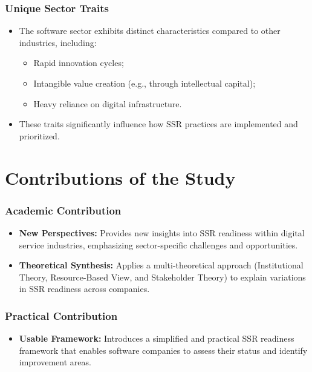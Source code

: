 \subsubsection{Unique Sector Traits}

\begin{itemize}
    \item The software sector exhibits distinct characteristics compared to other industries, including:
    \begin{itemize}
        \item Rapid innovation cycles;
        \item Intangible value creation (e.g., through intellectual capital);
        \item Heavy reliance on digital infrastructure.
    \end{itemize}
    \item These traits significantly influence how SSR practices are implemented and prioritized.
\end{itemize}

\section{Contributions of the Study}

\subsubsection{Academic Contribution}

\begin{itemize}
    \item \textbf{New Perspectives:}  
    Provides new insights into SSR readiness within digital service industries, 
    emphasizing sector-specific challenges and opportunities.
    
    \item \textbf{Theoretical Synthesis:}  
    Applies a multi-theoretical approach (Institutional Theory, Resource-Based View, and Stakeholder Theory) 
    to explain variations in SSR readiness across companies.
\end{itemize}

\subsubsection{Practical Contribution}

\begin{itemize}
    \item \textbf{Usable Framework:}  
    Introduces a simplified and practical SSR readiness framework that 
    enables software companies to assess their status and identify improvement areas.

\end{itemize}

